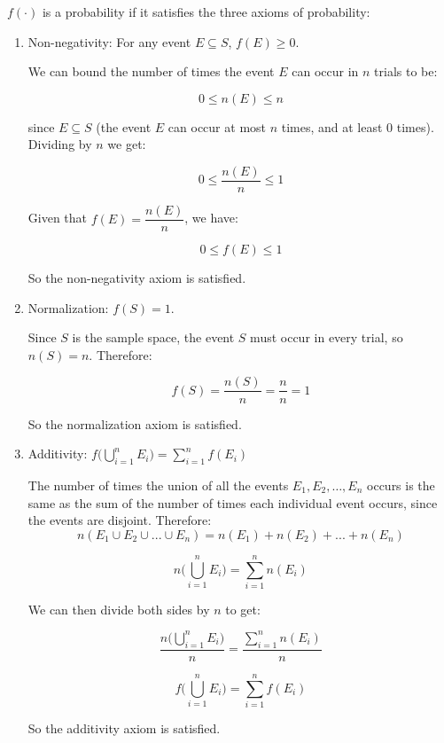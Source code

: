 \documentclass[10pt]{article}
\begin{document}
\divider

$f(\cdot)$ is a probability if it satisfies the three axioms of probability:

\begin{enumerate}
	\item Non-negativity: For any event $E\subseteq S$, $f(E)\ge 0$.

	      We can bound the number of times the event $E$ can occur in $n$ trials to be:

	      \[ 0 \le n(E) \le n \]

	      since $E \subseteq S$ (the event $E$ can occur at most $n$ times, and at least 0 times). Dividing by $n$ we get:

	      \[ 0 \le \frac{n(E)}{n} \le 1 \]

	      Given that $f(E) = \dfrac{n(E)}{n}$, we have:

	      \[ 0 \le f(E) \le 1 \]

	      So the non-negativity axiom is satisfied.

	\item Normalization: $f(S) = 1$.

	      Since $S$ is the sample space, the event $S$ must occur in every trial, so $n(S) = n$. Therefore:

	      \[
		      f(S) = \frac{n(S)}{n} = \frac{n}{n} = 1
	      \]

	      So the normalization axiom is satisfied.

	\item Additivity: $f \bigg( \bigcup_{i=1}^n E_i \bigg) = \sum_{i=1}^n f(E_i) $

	      The number of times the union of all the events $E_1, E_2, \ldots, E_n$ occurs is the same as the sum of the number of times each individual event occurs, since the events are disjoint. Therefore:
	      \[ n(E_1 \cup E_2 \cup ... \cup E_n) =n(E_1) + n(E_2) + ... + n(E_n) \]

	      \[ n \bigg(\bigcup_{i=1}^n E_i \bigg) = \sum_{i=1}^n n(E_i) \]

	      We can then divide both sides by $n$ to get:

	      \[ \frac{n \bigg(\bigcup_{i=1}^n E_i \bigg)}{n} = \frac{\sum_{i=1}^n n(E_i)}{n} \]

	      \[ f \bigg( \bigcup_{i=1}^n E_i \bigg) = \sum_{i=1}^n f(E_i) \]


	      So the additivity axiom is satisfied.



\end{enumerate}
\end{document}
